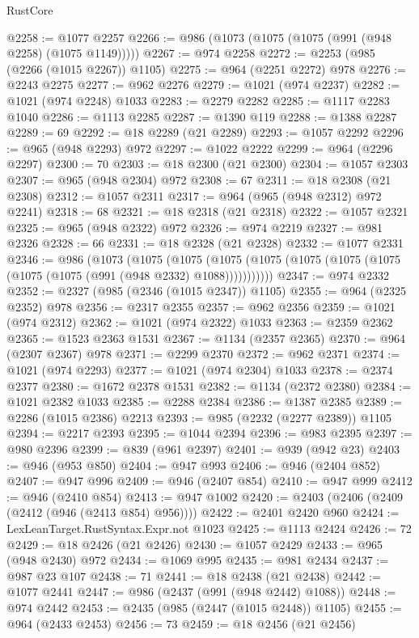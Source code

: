 \begin{lexlean}{RustCore}
\begin{coremodule}
@2258 := @1077 @2257
@2266 := @986 (@1073 (@1075 (@1075 (@991 (@948 @2258) (@1075 @1149)))))
@2267 := @974 @2258
@2272 := @2253 (@985 (@2266 (@1015 @2267)) @1105)
@2275 := @964 (@2251 @2272) @978
@2276 := @2243 @2275
@2277 := @962 @2276
@2279 := @1021 (@974 @2237)
@2282 := @1021 (@974 @2248) @1033
@2283 := @2279 @2282
@2285 := @1117 @2283 @1040
@2286 := @1113 @2285
@2287 := @1390 @119
@2288 := @1388 @2287
@2289 := 69
@2292 := @18 @2289 (@21 @2289)
@2293 := @1057 @2292
@2296 := @965 (@948 @2293) @972
@2297 := @1022 @2222
@2299 := @964 (@2296 @2297)
@2300 := 70
@2303 := @18 @2300 (@21 @2300)
@2304 := @1057 @2303
@2307 := @965 (@948 @2304) @972
@2308 := 67
@2311 := @18 @2308 (@21 @2308)
@2312 := @1057 @2311
@2317 := @964 (@965 (@948 @2312) @972 @2241)
@2318 := 68
@2321 := @18 @2318 (@21 @2318)
@2322 := @1057 @2321
@2325 := @965 (@948 @2322) @972
@2326 := @974 @2219
@2327 := @981 @2326
@2328 := 66
@2331 := @18 @2328 (@21 @2328)
@2332 := @1077 @2331
@2346 := @986
    (@1073
      (@1075
        (@1075 (@1075 (@1075 (@1075 (@1075 (@1075 (@1075 (@1075 (@991 (@948 @2332) @1088)))))))))))
@2347 := @974 @2332
@2352 := @2327 (@985 (@2346 (@1015 @2347)) @1105)
@2355 := @964 (@2325 @2352) @978
@2356 := @2317 @2355
@2357 := @962 @2356
@2359 := @1021 (@974 @2312)
@2362 := @1021 (@974 @2322) @1033
@2363 := @2359 @2362
@2365 := @1523 @2363 @1531
@2367 := @1134 (@2357 @2365)
@2370 := @964 (@2307 @2367) @978
@2371 := @2299 @2370
@2372 := @962 @2371
@2374 := @1021 (@974 @2293)
@2377 := @1021 (@974 @2304) @1033
@2378 := @2374 @2377
@2380 := @1672 @2378 @1531
@2382 := @1134 (@2372 @2380)
@2384 := @1021 @2382 @1033
@2385 := @2288 @2384
@2386 := @1387 @2385
@2389 := @2286 (@1015 @2386) @2213
@2393 := @985 (@2232 (@2277 @2389)) @1105
@2394 := @2217 @2393
@2395 := @1044 @2394
@2396 := @983 @2395
@2397 := @980 @2396
@2399 := @839 (@961 @2397)
@2401 := @939 (@942 @23)
@2403 := @946 (@953 @850)
@2404 := @947 @993
@2406 := @946 (@2404 @852)
@2407 := @947 @996
@2409 := @946 (@2407 @854)
@2410 := @947 @999
@2412 := @946 (@2410 @854)
@2413 := @947 @1002
@2420 := @2403 (@2406 (@2409 (@2412 (@946 (@2413 @854) @956))))
@2422 := @2401 @2420 @960
@2424 := LexLeanTarget.RustSyntax.Expr.not @1023
@2425 := @1113 @2424
@2426 := 72
@2429 := @18 @2426 (@21 @2426)
@2430 := @1057 @2429
@2433 := @965 (@948 @2430) @972
@2434 := @1069 @995
@2435 := @981 @2434
@2437 := @987 @23 @107
@2438 := 71
@2441 := @18 @2438 (@21 @2438)
@2442 := @1077 @2441
@2447 := @986 (@2437 (@991 (@948 @2442) @1088))
@2448 := @974 @2442
@2453 := @2435 (@985 (@2447 (@1015 @2448)) @1105)
@2455 := @964 (@2433 @2453)
@2456 := 73
@2459 := @18 @2456 (@21 @2456)

\end{coremodule}
\end{lexlean}
